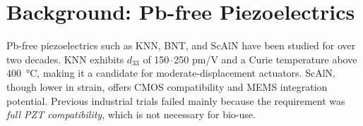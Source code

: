 \section{Background: Pb-free Piezoelectrics}
Pb-free piezoelectrics such as KNN, BNT, and ScAlN have been studied
for over two decades.
KNN exhibits $d_{33}$ of 150--250 pm/V and a Curie temperature above
400~°C, making it a candidate for moderate-displacement actuators.
ScAlN, though lower in strain, offers CMOS compatibility and MEMS
integration potential.
Previous industrial trials failed mainly because the requirement was
\textit{full PZT compatibility}, which is not necessary for bio-use.
